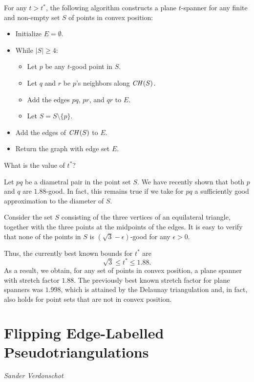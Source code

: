 \documentclass{patmorin}
\begin{document}
For any $t>t^*$, the following algorithm constructs a plane $t$-spanner 
for any finite and non-empty set $S$ of points in convex position:  
\begin{itemize} 
\item Initialize $E = \emptyset$.  
\item While $|S| \geq 4$: 
      \begin{itemize} 
      \item Let $p$ be any $t$-good point in $S$. 
      \item Let $q$ and $r$ be $p$'s neighbors along $\mathord{\it CH}(S)$. 
      \item Add the edges $pq$, $pr$, and $qr$ to $E$. 
      \item Let $S = S \setminus \{p\}$. 
      \end{itemize} 
\item Add the edges of $\mathord{\it CH}(S)$ to $E$. 
\item Return the graph with edge set $E$. 
\end{itemize} 

\begin{op} 
What is the value of $t^*$? 
\end{op} 

Let $pq$ be a diametral pair in the point set $S$. We have recently 
shown that both $p$ and $q$ are $1.88$-good. In fact, this remains 
true if we take for $pq$ a sufficiently good approximation to the 
diameter of $S$. 

Consider the set $S$ consisting of the three vertices of an equilateral  
triangle, together with the three points at the midpoints of the 
edges. It is easy to verify that none of the points in $S$ is 
$(\sqrt{3} - \epsilon)$-good for any $\epsilon>0$. 

Thus, the currently best known bounds for $t^*$ are 
\[ \sqrt{3} \leq t^* \leq 1.88 . 
\] 
As a result, we obtain, for any set of points in convex position, a 
plane spanner with stretch factor $1.88$. The previously best known 
stretch factor for plane spanners was $1.998$, which is attained by the 
Delaunay triangulation and, in fact, also holds for point sets that 
are not in convex position. 

\section{Flipping Edge-Labelled Pseudotriangulations}

\noindent\emph{Sander Verdonschot}
\end{document}
